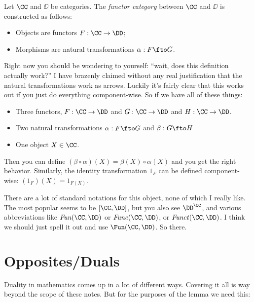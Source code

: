 \begin{defn}
 Let $\CC$ and $\DD$ be categories. The \emph{functor category} between $\CC$ and $\DD$ is
 constructed as follows:
 \begin{itemize}
  \item Objects are functors $F: \CC \to \DD$;
  \item Morphisms are natural transformations $\alpha:F\fto G$.
 \end{itemize}
\end{defn}
\noindent
Right now you should be wondering to yourself: ``wait, does this definition actually
work?'' I have brazenly claimed without any real justification that the natural
transformations work as arrows. Luckily it's fairly clear that this works out if you just
do everything component-wise. So if we have all of these things: 
\begin{itemize}
\item Three functors, $F: \CC \to \DD$ and $G: \CC \to \DD$ and $H:\CC \to \DD$.

\item Two natural transformations $\alpha: F \fto G$ and $\beta: G \fto H$

\item One object $X \in \CC$.
\end{itemize}
\noindent
Then you can define $(\beta \circ \alpha)(X) = \beta(X) \circ \alpha(X)$ and you get the
right behavior. Similarly, the identity transformation $1_F$ can be defined
component-wise: $(1_F)(X) = 1_{F(X)}$.

There are a lot of standard notations for this object, none of which I really like. The
most popular seems to be $[\CC, \DD]$, but you also see $\DD^{\CC}$, and various  
abbreviations like $\mathop{\mathit{Fun}}(\CC,\DD)$ or $\mathop{\mathit{Func}}(\CC,\DD)$,
or $\mathop{\mathit{Funct}}(\CC,\DD)$. I think we should just spell it out and use
$\Fun(\CC,\DD)$. So there.

\section{Opposites/Duals}

Duality in mathematics comes up in a lot of different ways. Covering it all is way beyond
the scope of these notes. But for the purposes of the lemma we need this:

